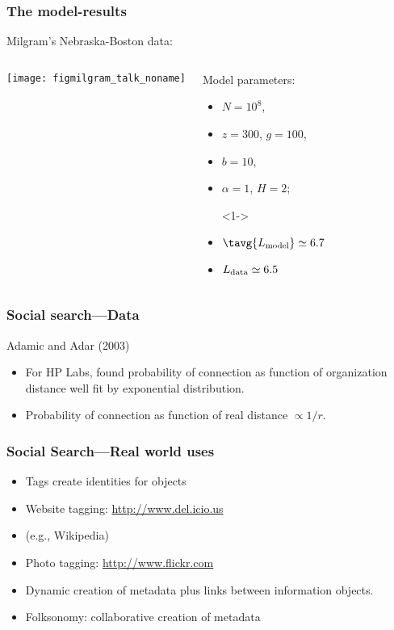  
\begin{frame}
  \frametitle{The model-results}

  Milgram's Nebraska-Boston data:

  \begin{columns}
    \texttt{[image: figmilgram\_talk\_noname]}%
    \begin{block}{Model parameters:}
      \begin{itemize}
      \item<1->
        $N=10^8$, 
      \item<1->
        $z=300$, $g=100$,
      \item<1->
        $b=10$,  
      \item<1->
        $\alpha=1$, $H=2$; 
      \item[]<1->
      \item<1->
        $\tavg{L_{\textnormal{model}}} \simeq 6.7$
      \item<1->
        ${L_{\textnormal{data}}} \simeq 6.5$
      \end{itemize}
    \end{block}
  \end{columns}

\end{frame}

\begin{frame}
  \frametitle{Social search---Data}

  \begin{block}{Adamic and Adar (2003)}
    \begin{itemize}
    \item<1->
      For HP Labs, found probability of connection
      as function of organization distance
      well fit by exponential distribution.
    \item<2->
      Probability of connection as function of
      real distance $\propto 1/r$.
    \end{itemize}
  \end{block}

\end{frame}

\begin{frame}
  \frametitle{Social Search---Real world uses}

  \begin{itemize}
  \item 
  Tags create identities for objects
  \item 
  Website tagging:
  \url{http://www.del.icio.us}
  \item 
  (e.g., Wikipedia)
  \item 
  Photo tagging:
  \url{http://www.flickr.com}
  \item 
  Dynamic creation of metadata
  plus links between information objects.
  \item 
  Folksonomy: collaborative creation of metadata
  \end{itemize}
  
\end{frame}

